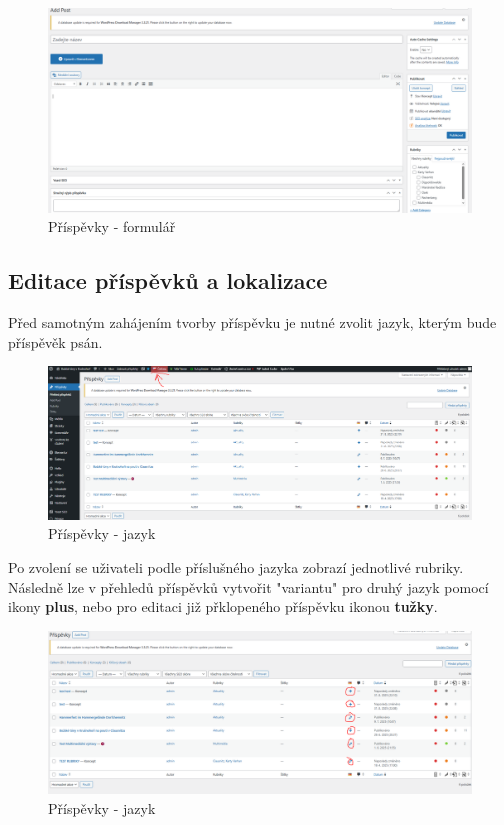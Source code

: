 \documentclass[12pt,a4paper]{article}
\begin{document}
	\begin{figure}[htp]
		\centering
		\includegraphics[width=16cm]{WPnewpost.png}
		\caption{Příspěvky - formulář}
		\label{fig:role}
	\end{figure}
	
	\newpage
	\subsection{Editace příspěvků a lokalizace}
	
	Před samotným zahájením tvorby příspěvku je nutné zvolit jazyk, kterým bude příspěvěk psán.
	
	\begin{figure}[htp]
		\centering
		\includegraphics[width=15cm]{WPprispevkylang.png}
		\caption{Příspěvky - jazyk}
		\label{fig:role}
	\end{figure}
	
	Po zvolení se uživateli podle příslušného jazyka zobrazí jednotlivé rubriky. Následně lze v přehledů příspěvků vytvořit "variantu" pro druhý jazyk pomocí ikony \textbf{plus}, nebo pro editaci již přklopeného příspěvku ikonou \textbf{tužky}.
	
	\begin{figure}[htp]
		\centering
		\includegraphics[width=15cm]{WPeditprispevek.png}
		\caption{Příspěvky - jazyk}
		\label{fig:role}
	\end{figure}
	
\end{document}
